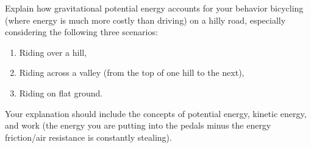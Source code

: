 \documentclass{reflection}
\begin{document}
\maketitle

Explain how gravitational potential energy accounts for your behavior bicycling (where energy is much more costly than driving) on a hilly road, especially considering the following three scenarios:
    \begin{enumerate}
        \item Riding over a hill,
        \item Riding across a valley (from the top of one hill to the next),
        \item Riding on flat ground.
    \end{enumerate}
    Your explanation should include the concepts of potential energy, kinetic energy, and work (the energy you are putting into the pedals minus the energy friction/air resistance is constantly stealing).

\end{document}

